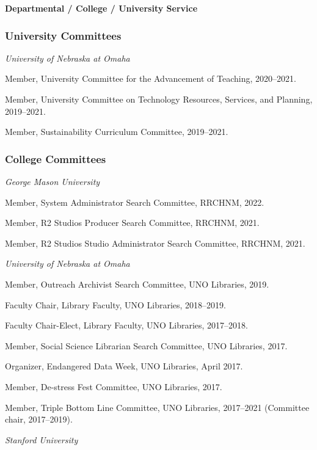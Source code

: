 \vspace{.4cm}

\textbf{Departmental / College / University Service}

\subsubsection{University Committees}\label{university-committees}

\emph{University of Nebraska at Omaha}

Member, University Committee for the Advancement of Teaching,
2020--2021.

Member, University Committee on Technology Resources, Services, and
Planning, 2019--2021.

Member, Sustainability Curriculum Committee, 2019--2021.

\subsubsection{College Committees}\label{college-committees}

\emph{George Mason University}

Member, System Administrator Search Committee, RRCHNM, 2022.

Member, R2 Studios Producer Search Committee, RRCHNM, 2021.

Member, R2 Studios Studio Administrator Search Committee, RRCHNM, 2021.

\vspace{.4cm}

\emph{University of Nebraska at Omaha}

Member, Outreach Archivist Search Committee, UNO Libraries, 2019.

Faculty Chair, Library Faculty, UNO Libraries, 2018--2019.

Faculty Chair-Elect, Library Faculty, UNO Libraries, 2017--2018.

Member, Social Science Librarian Search Committee, UNO Libraries, 2017.

Organizer, Endangered Data Week, UNO Libraries, April 2017.

Member, De-stress Fest Committee, UNO Libraries, 2017.

Member, Triple Bottom Line Committee, UNO Libraries, 2017--2021
(Committee chair, 2017--2019).

\vspace{.4cm}

\emph{Stanford University}


